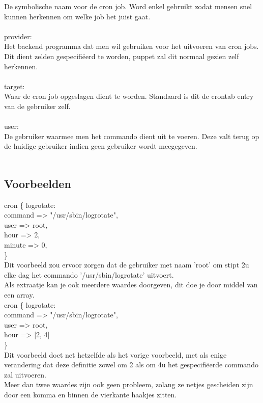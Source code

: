 De symbolische naam voor de cron job. Word enkel gebruikt zodat mensen snel kunnen herkennen om welke job het juist gaat.\\\\
%
provider:\\
Het backend programma dat men wil gebruiken voor het uitvoeren van cron jobs. Dit dient zelden gespecifi\"{e}erd te worden, puppet zal dit normaal gezien zelf herkennen.\\\\
%
target:\\
Waar de cron job opgeslagen dient te worden. Standaard is dit de crontab entry van de gebruiker zelf.\\\\
%
user:\\
De gebruiker waarmee men het commando dient uit te voeren. Deze valt terug op de huidige gebruiker indien geen gebruiker wordt meegegeven.\\\\

\subsection{Voorbeelden}
	cron \{ logrotate:\\
		command => "/usr/sbin/logrotate",\\
		user => root,\\
		hour => 2,\\
		minute => 0,\\
	\}\\

	Dit voorbeeld zou ervoor zorgen dat de gebruiker met naam 'root' om stipt 2u elke dag het commando '/usr/sbin/logrotate' uitvoert.\\
	Als extraatje kan je ook meerdere waardes doorgeven, dit doe je door middel van een array.\\

	cron \{ logrotate:\\
		command => "/usr/sbin/logrotate",\\
		user => root,\\
		hour => [2, 4]\\
	\}\\

	Dit voorbeeld doet net hetzelfde als het vorige voorbeeld, met als enige verandering dat deze definitie zowel om 2 als om 4u het gespecifi\"{e}erde commando zal uitvoeren.\\
	Meer dan twee waardes zijn ook geen probleem, zolang ze netjes gescheiden zijn door een komma en binnen de vierkante haakjes zitten.\\

